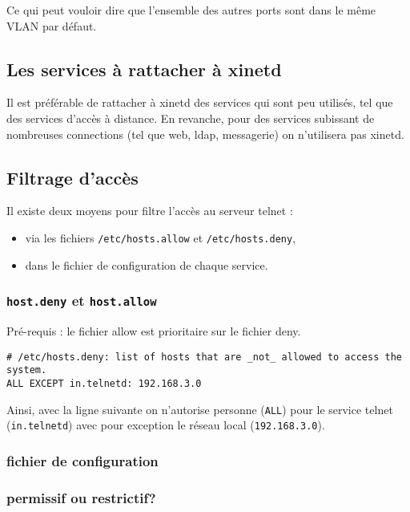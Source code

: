 \documentclass[12pt,a4paper,notitlepage]{article}
\begin{document}
Ce qui peut vouloir dire que l'ensemble des autres ports sont dans le même VLAN par défaut.

\subsection{Les services à rattacher à xinetd}
Il est préférable de rattacher à xinetd des services qui sont peu utilisés, tel que des services d'accès à distance. En revanche, pour des services subissant de nombreuses connections (tel que web, ldap, messagerie) on n'utilisera pas xinetd.

\subsection{Filtrage d'accès}

Il existe deux moyens pour filtre l'accès au serveur telnet : 
\begin{itemize}
\item via les fichiers \texttt{/etc/hosts.allow} et \texttt{/etc/hosts.deny},
\item dans le fichier de configuration de chaque service.
\end{itemize}

\subsubsection{\texttt{host.deny} et \texttt{host.allow}}

\noindent Pré-requis : le fichier allow est prioritaire sur le fichier deny.\\

\begin{lstlisting}
# /etc/hosts.deny: list of hosts that are _not_ allowed to access the system.
ALL EXCEPT in.telnetd: 192.168.3.0
\end{lstlisting}
Ainsi, avec la ligne suivante on n'autorise personne (\texttt{ALL}) pour le service telnet (\texttt{in.telnetd}) avec pour exception le réseau local (\texttt{192.168.3.0}).


\subsubsection{fichier de configuration}


\subsubsection{permissif ou restrictif?}
\end{document}
